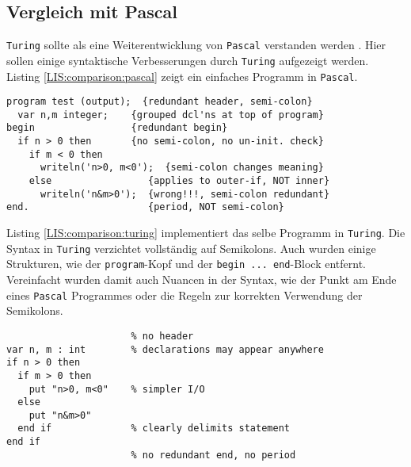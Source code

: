 \subsection{Vergleich mit Pascal}

\texttt{Turing} sollte als eine Weiterentwicklung von \texttt{Pascal} verstanden werden \cite{Perelgut:88}. Hier sollen einige syntaktische Verbesserungen durch \texttt{Turing} aufgezeigt werden. Listing \ref{LIS:comparison:pascal} zeigt ein einfaches Programm in \texttt{Pascal}.

\lstset{label=LIS:comparison:pascal}
\begin{table}[h!]
\begin{lstlisting}
program test (output);  {redundant header, semi-colon}
  var n,m integer;    {grouped dcl'ns at top of program}
begin                 {redundant begin}
  if n > 0 then       {no semi-colon, no un-init. check}
    if m < 0 then
      writeln('n>0, m<0');  {semi-colon changes meaning}
    else                 {applies to outer-if, NOT inner}
      writeln('n&m>0');  {wrong!!!, semi-colon redundant}
end.                     {period, NOT semi-colon}
\end{lstlisting}
\end{table}

Listing \ref{LIS:comparison:turing} implementiert das selbe Programm in \texttt{Turing}. Die Syntax in \texttt{Turing} verzichtet vollst\"andig auf Semikolons. Auch wurden einige Strukturen, wie der \lstinline{program}-Kopf und der \lstinline{begin ... end}-Block entfernt. Vereinfacht wurden damit auch Nuancen in der Syntax, wie der Punkt am Ende eines \texttt{Pascal} Programmes oder die Regeln zur korrekten Verwendung der Semikolons.

\lstset{label=LIS:comparison:turing}
\begin{table}[h!]
\begin{lstlisting}
                      % no header
var n, m : int        % declarations may appear anywhere
if n > 0 then         
  if m > 0 then
    put "n>0, m<0"    % simpler I/O
  else
    put "n&m>0" 
  end if              % clearly delimits statement
end if
                      % no redundant end, no period
\end{lstlisting}
\end{table}

